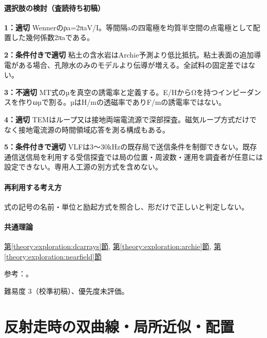 \paragraph{選択肢の検討（査読待ち初稿）}\mbox{}\par

\noindent\textbf{1：適切} Wennerのρa=\allowbreak{}2πaV/I。等間隔aの四電極を均質半空間の点電極として配置した幾何係数2πaである。\par

\noindent\textbf{2：条件付きで適切} 粘土の含水岩はArchie予測より低比抵抗。粘土表面の追加導電がある場合、孔隙水のみのモデルより伝導が増える。全試料の固定差ではない。\par

\noindent\textbf{3：不適切} MT式のµを真空の誘電率と定義する。E/HからΩを持つインピーダンスを作りωµで割る。µはH/mの透磁率でありF/mの誘電率ではない。\par

\noindent\textbf{4：適切} TEMはループ又は接地両端電流源で深部探査。磁気ループ方式だけでなく接地電流源の時間領域応答を測る構成もある。\par

\noindent\textbf{5：条件付きで適切} VLFは3〜30kHzの既存局で送信条件を制御できない。既存通信送信局を利用する受信探査では局の位置・周波数・運用を調査者が任意には設定できない。専用人工源の別方式を含めない。\par

\paragraph{再利用する考え方} 式の記号の名前・単位と励起方式を照合し、形だけで正しいと判定しない。

\paragraph{共通理論} \hyperref[theory:exploration:dcarrays]{第\ref*{theory:exploration:dcarrays}節}, \hyperref[theory:exploration:archie]{第\ref*{theory:exploration:archie}節}, \hyperref[theory:exploration:nearfield]{第\ref*{theory:exploration:nearfield}節}

\par 参考：\cite{epa_resistivity,usgs_csamt2012,epa_borehole_resistivity,epa_tdem_archive}。

\par 難易度 3（校準初稿）、優先度未評価。

\section{反射走時の双曲線・局所近似・配置}

